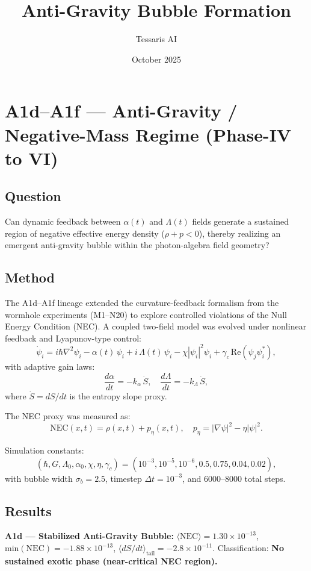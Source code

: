 \documentclass{article}
\title{Anti-Gravity Bubble Formation}
\author{Tessaris AI}
\date{October 2025}
\begin{document}
\maketitle

\section*{A1d–A1f — Anti-Gravity / Negative-Mass Regime (Phase-IV to VI)}

\subsection*{Question}
Can dynamic feedback between \(\alpha(t)\) and \(\Lambda(t)\) fields generate a sustained region of negative effective energy density (\(\rho + p < 0\)), thereby realizing an emergent anti-gravity bubble within the photon-algebra field geometry?

\subsection*{Method}
The A1d–A1f lineage extended the curvature-feedback formalism from the wormhole experiments (M1–N20) to explore controlled violations of the Null Energy Condition (NEC).  
A coupled two-field model was evolved under nonlinear feedback and Lyapunov-type control:
\[
\dot\psi_i = i \hbar \nabla^2 \psi_i 
             - \alpha(t)\, \psi_i 
             + i\,\Lambda(t)\, \psi_i
             - \chi |\psi_i|^2 \psi_i
             + \gamma_c\,\mathrm{Re}(\psi_j \psi_i^*),
\]
with adaptive gain laws:
\[
\frac{d\alpha}{dt} = -k_\alpha\,\dot S, \quad
\frac{d\Lambda}{dt} = -k_\Lambda\,\dot S,
\]
where \(\dot S = dS/dt\) is the entropy slope proxy.  

The NEC proxy was measured as:
\[
\mathrm{NEC}(x,t) = \rho(x,t) + p_\eta(x,t),
\quad p_\eta = |\nabla\psi|^2 - \eta|\psi|^2.
\]

Simulation constants:
\[
(\hbar,G,\Lambda_0,\alpha_0,\chi,\eta,\gamma_c)
= (10^{-3},10^{-5},10^{-6},0.5,0.75,0.04,0.02),
\]
with bubble width \(\sigma_b = 2.5\), timestep \(\Delta t = 10^{-3}\), and 6000–8000 total steps.

\subsection*{Results}
\textbf{A1d — Stabilized Anti-Gravity Bubble:}  
\(\langle \mathrm{NEC} \rangle = 1.30\times10^{-13}\), 
\(\mathrm{min(NEC)} = -1.88\times10^{-13}\),  
\(\langle dS/dt \rangle_{\mathrm{tail}} = -2.8\times10^{-11}\).  
Classification: \textbf{No sustained exotic phase (near-critical NEC region).}
\end{document}
